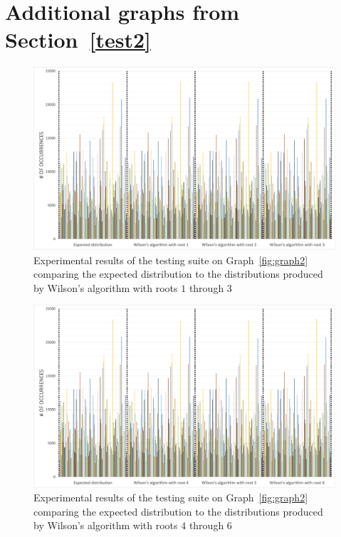 \documentclass[11pt]{article}
\begin{document}
\begin{appendices}\label{appendix}

\section{Additional graphs from Section~\ref{test2}}\label{appendix1}

\begin{figure}[ht]
\includegraphics[scale=0.40]{figs/fig4.png}
\caption{Experimental results of the testing suite on Graph~\ref{fig:graph2} comparing the expected distribution to the distributions produced by Wilson's algorithm with roots $1$ through $3$}
\centering
\label{fig4}
\end{figure}

\begin{figure}[ht]
\includegraphics[scale=0.40]{figs/fig5.png}
\caption{Experimental results of the testing suite on Graph~\ref{fig:graph2} comparing the expected distribution to the distributions produced by Wilson's algorithm with roots $4$ through $6$}
\centering
\label{fig5}
\end{figure}

\end{appendices}
\end{document}
